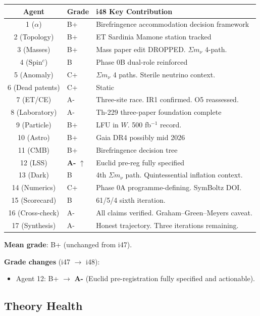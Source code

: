 \documentclass[11pt,a4paper]{article}
\begin{document}
\begin{center}
\begin{tabular}{clp{8cm}}
\toprule
\textbf{Agent} & \textbf{Grade} & \textbf{i48 Key Contribution} \\
\midrule
1 ($\alpha$) & B+ & Birefringence accommodation decision framework \\
2 (Topology) & B+ & ET Sardinia Mamone station tracked \\
3 (Masses) & B+ & Mass paper edit DROPPED. $\Sigma m_\nu$ 4-path. \\
4 (Spin$^c$) & B & Phase 0B dual-role reinforced \\
5 (Anomaly) & C+ & $\Sigma m_\nu$ 4 paths. Sterile neutrino context. \\
6 (Dead patents) & C+ & Static \\
7 (ET/CE) & A- & Three-site race. IR1 confirmed. O5 reassessed. \\
8 (Laboratory) & A- & Th-229 three-paper foundation complete \\
9 (Particle) & B+ & LFU in $W$. 500 fb$^{-1}$ record. \\
10 (Astro) & B+ & Gaia DR4 possibly mid 2026 \\
11 (CMB) & B+ & Birefringence decision tree \\
12 (LSS) & \textbf{A-} $\uparrow$ & Euclid pre-reg fully specified \\
13 (Dark) & B & 4th $\Sigma m_\nu$ path. Quintessential inflation context. \\
14 (Numerics) & C+ & Phase 0A programme-defining. SymBoltz DOI. \\
15 (Scorecard) & B & 61/5/4 sixth iteration. \\
16 (Cross-check) & A- & All claims verified. Graham--Green--Meyers caveat. \\
17 (Synthesis) & A- & Honest trajectory. Three iterations remaining. \\
\bottomrule
\end{tabular}
\end{center}

\textbf{Mean grade}: B+ (unchanged from i47).

\textbf{Grade changes} (i47 $\to$ i48):
\begin{itemize}
\item Agent 12: B+ $\to$ \textbf{A-} (Euclid pre-registration fully specified and actionable).
\end{itemize}

\subsection{Theory Health}
\end{document}
